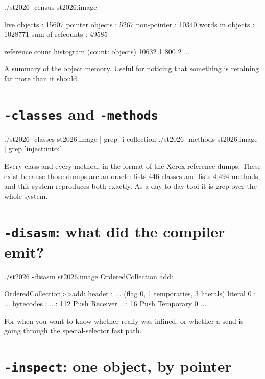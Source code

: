 \begin{sh}
./st2026 -census st2026.image
\end{sh}

\begin{plain}
live objects     : 15607
pointer objects  : 5267
non-pointer      : 10340
words in objects : 1028771
sum of refcounts : 49585

reference count histogram (count: objects)
 10632 1
   800 2
   ...
\end{plain}

A summary of the object memory. Useful for noticing that something is
retaining far more than it should.

\section{\texttt{-classes} and \texttt{-methods}}

\begin{sh}
./st2026 -classes st2026.image | grep -i collection
./st2026 -methods st2026.image | grep 'inject:into:'
\end{sh}

Every class and every method, in the format of the Xerox reference dumps.
These exist because those dumps are an oracle:  lists 446
classes and  lists 4,494 methods, and this system reproduces
both exactly. As a day-to-day tool it is grep over the whole system.

\section{\texttt{-disasm}: what did the compiler emit?}

\begin{sh}
./st2026 -disasm st2026.image OrderedCollection add:
\end{sh}

\begin{plain}
OrderedCollection>>add:
  header      : ... (flag 0, 1 temporaries, 3 literals)
  literal 0   : ...
  bytecodes   :
      ...: 112          Push Receiver
      ...:  16          Push Temporary 0
      ...
\end{plain}

For when you want to know whether  really was inlined, or whether
a send is going through the special-selector fast path.

\section{\texttt{-inspect}: one object, by pointer}

